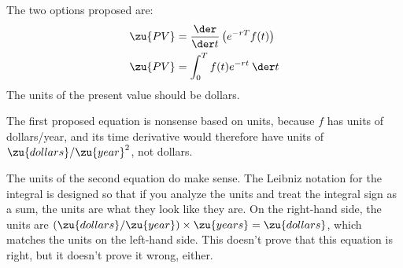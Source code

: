 The two options proposed are:
\begin{align*}
  \zu{PV} &= \frac{\der}{\der t} \left(e^{-rT}f(t)\right) \\
  \zu{PV} &= \int_0^T f(t)e^{-rt}\:\der t
\end{align*}
The units of the present value should be dollars.

The first proposed equation is nonsense based on units,
because $f$ has units of dollars/year, and its time derivative would therefore have units
of $\zu{dollars}/\zu{year}^2$, not dollars.

The units of the second equation do make sense. The Leibniz notation for the
integral is designed so that if you analyze the units and treat the integral sign
as a sum, the units are what they look like they are. On the right-hand side, the
units are $(\zu{dollars}/\zu{year})\times\zu{years}=\zu{dollars}$, which matches
the units on the left-hand side. This doesn't prove that this equation is right,
but it doesn't prove it wrong, either.
